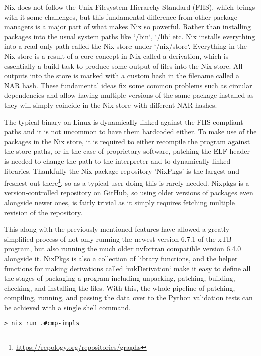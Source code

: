Nix does not follow the Unix Filesystem Hierarchy Standard (FHS), which brings with it some challenges, but this fundamental difference from other package managers is a major part of what makes Nix so powerful.
Rather than installing packages into the usual system paths like `/bin`, `/lib` etc. Nix installs everything into a read-only path called the Nix store under `/nix/store`.
Everything in the Nix store is a result of a core concept in Nix called a derivation, which is essentially a build task to produce some output of files into the Nix store.
All outputs into the store is marked with a custom hash in the filename called a NAR hash. These fundamental ideas fix some common problems such as circular dependencies and allow having multiple versions of the same package installed as they will simply coincide in the Nix store with different NAR hashes.

The typical binary on Linux is dynamically linked against the FHS compliant paths and it is not uncommon to have them hardcoded either. To make use of the packages in the Nix store, it is required to either recompile the program against the store paths, or in the case of proprietary software, patching the ELF header is needed to change the path to the interpreter and to dynamically linked libraries. Thankfully the Nix package repository 'NixPkgs' is the largest and freshest out there\footnote{\url{https://repology.org/repositories/graphs}}, so as a typical user doing this is rarely needed.
Nixpkgs is a version-controlled repository on GitHub, so using older versions of packages even alongside newer ones, is fairly trivial as it simply requires fetching multiple revision of the repository.

This along with the previously mentioned features have allowed a greatly simplified process of not only running the newest version 6.7.1 of the xTB program, but also running the much older nvfortran compatible version 6.4.0 alongside it.
NixPkgs is also a collection of library functions, and the helper functions for making derivations called `mkDerivation` make it easy to define all the stages of packaging a program including unpacking, patching, building, checking, and installing the files.
With this, the whole pipeline of patching, compiling, running, and passing the data over to the Python validation tests can be achieved with a single shell command.

\begin{verbatim}
> nix run .#cmp-impls
\end{verbatim}


